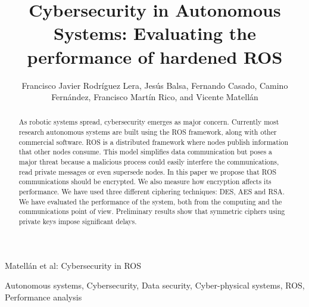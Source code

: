 \documentclass[journal,twoside]{JoPhA}
\begin{document}
\title{Cybersecurity in Autonomous Systems: Evaluating the performance of hardened ROS}

\author{Francisco Javier Rodr\'iguez Lera, Jes\'us Balsa, Fernando Casado, Camino Fern\'andez, Francisco Mart\'in Rico, and Vicente Matell\'an
}






%
{Matell\'an et al: Cybersecurity in ROS}
\maketitle


\begin{abstract}
As robotic systems spread, cybersecurity emerges as major concern. Currently most research autonomous systems are built using the ROS framework, along with other commercial software. 
ROS is a distributed framework where nodes publish information that other nodes consume. 
This model simplifies data communication but poses a major threat because a malicious process could easily interfere the communications, read private messages or even supersede nodes. In this paper we propose that ROS communications should be encrypted. We also measure how encryption affects its performance. We have used three different ciphering techniques: DES, AES and RSA. We have evaluated the performance of the system, both from the computing and the communications point of view. Preliminary results show that symmetric ciphers using private keys impose significant delays.
\end{abstract}


\begin{IEEEkeywords}
Autonomous systems, Cybersecurity, Data security, Cyber-physical systems, ROS, Performance analysis
\end{IEEEkeywords}
\end{document}
